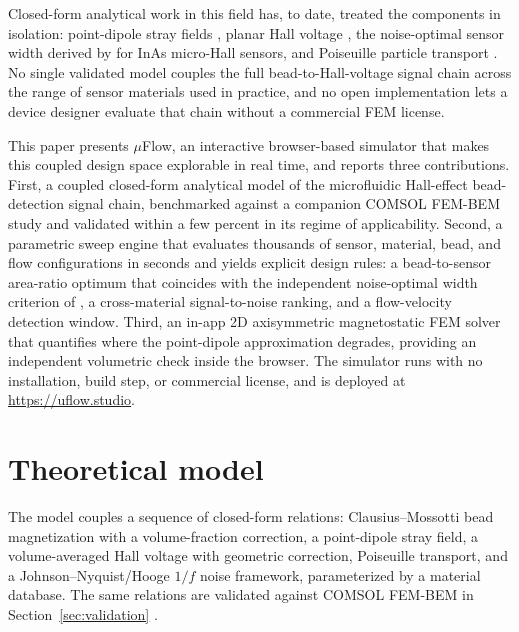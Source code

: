 \documentclass[pdflatex,sn-basic]{sn-jnl}
\theoremstyle{thmstyleone}
\theoremstyle{thmstyletwo}
\theoremstyle{thmstylethree}
\begin{document}
Closed-form analytical work in this field has, to date, treated the components in isolation: point-dipole stray fields \citep{griffiths}, planar Hall voltage \citep{popovic2004}, the noise-optimal sensor width derived by \citet{mihajlovic2007} for InAs micro-Hall sensors, and Poiseuille particle transport \citep{hewlin2023}. No single validated model couples the full bead-to-Hall-voltage signal chain across the range of sensor materials used in practice, and no open implementation lets a device designer evaluate that chain without a commercial FEM license.

This paper presents $\mu$Flow, an interactive browser-based simulator that makes this coupled design space explorable in real time, and reports three contributions. First, a coupled closed-form analytical model of the microfluidic Hall-effect bead-detection signal chain, benchmarked against a companion COMSOL FEM-BEM study and validated within a few percent in its regime of applicability. Second, a parametric sweep engine that evaluates thousands of sensor, material, bead, and flow configurations in seconds and yields explicit design rules: a bead-to-sensor area-ratio optimum that coincides with the independent noise-optimal width criterion of \citet{mihajlovic2007}, a cross-material signal-to-noise ranking, and a flow-velocity detection window. Third, an in-app 2D axisymmetric magnetostatic FEM solver that quantifies where the point-dipole approximation degrades, providing an independent volumetric check inside the browser. The simulator runs with no installation, build step, or commercial license, and is deployed at \url{https://uflow.studio}.

\section{Theoretical model}\label{sec:theory}

The model couples a sequence of closed-form relations: Clausius--Mossotti bead magnetization with a volume-fraction correction, a point-dipole stray field, a volume-averaged Hall voltage with geometric correction, Poiseuille transport, and a Johnson--Nyquist/Hooge $1/f$ noise framework, parameterized by a material database. The same relations are validated against COMSOL FEM-BEM in Section~\ref{sec:validation} \citep{govindaraju2025}.

\end{document}
